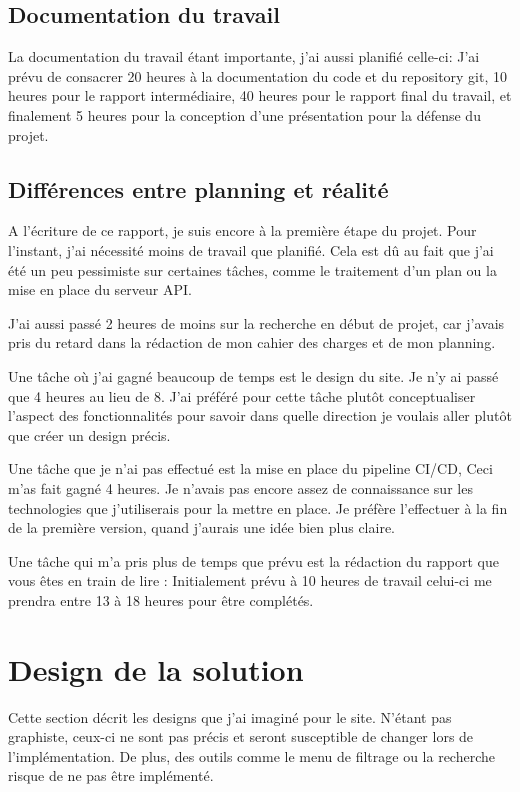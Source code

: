 \documentclass[
    iai, %
    il, %
]{heig-tb}
\begin{document}
\section{Documentation du travail}
La documentation du travail étant importante, j'ai aussi planifié celle-ci:
J'ai prévu de consacrer 20 heures à la documentation du code et du repository git,
10 heures pour le rapport intermédiaire,
40 heures pour le rapport final du travail,
et finalement 5 heures pour la conception d'une présentation pour la défense du projet.

\section{Différences entre planning et réalité}
A l'écriture de ce rapport, je suis encore à la première étape du projet.
Pour l'instant, j'ai nécessité moins de travail que planifié.
Cela est dû au fait que j'ai été un peu pessimiste sur certaines tâches,
comme le traitement d'un plan ou la mise en place du serveur API.

J'ai aussi passé 2 heures de moins sur la recherche en début de projet,
car j'avais pris du retard dans la rédaction de mon cahier des charges et de mon planning.

Une tâche où j'ai gagné beaucoup de temps est le design du site. Je n'y ai passé que 4 heures au lieu de 8.
J'ai préféré pour cette tâche plutôt conceptualiser l'aspect des fonctionnalités
pour savoir dans quelle direction je voulais aller plutôt que créer un design précis.

Une tâche que je n'ai pas effectué est la mise en place du pipeline CI/CD, Ceci m'as fait gagné 4 heures.
Je n'avais pas encore assez de connaissance sur les technologies que j'utiliserais pour la mettre en place.
Je préfère l'effectuer à la fin de la première version, quand j'aurais une idée bien plus claire.

Une tâche qui m'a pris plus de temps que prévu est la rédaction du rapport que vous êtes en train de lire :
Initialement prévu à 10 heures de travail celui-ci me prendra entre 13 à 18 heures pour être complétés.

\chapter{Design de la solution}
Cette section décrit les designs que j'ai imaginé pour le site.
N'étant pas graphiste, ceux-ci ne sont pas précis et seront susceptible de changer lors de l'implémentation.
De plus, des outils comme le menu de filtrage ou la recherche risque de ne pas être implémenté.
\end{document}
